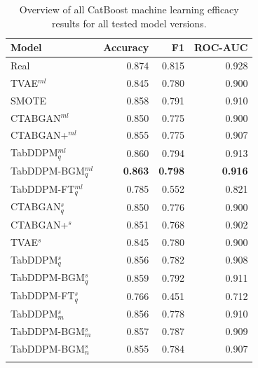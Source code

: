 \begin{table}[h]
	\centering
	\begin{tabular}{lrrr}
		\toprule
		\textbf{Model}        & \textbf{Accuracy} & \textbf{F1}    & \textbf{ROC-AUC} \\
		\midrule
		Real                  & 0.874              & 0.815          & 0.928            \\
		TVAE$^{ml}$           & 0.845              & 0.780          & 0.900            \\
		SMOTE                 & 0.858              & 0.791          & 0.910            \\
		CTABGAN$^{ml}$        & 0.850              & 0.775          & 0.900            \\
		CTABGAN+$^{ml}$       & 0.855              & 0.775          & 0.907            \\
		TabDDPM$^{ml}_q$      & 0.860              & 0.794          & 0.913            \\
		TabDDPM-BGM$^{ml}_q$  & \textbf{0.863}     & \textbf{0.798} & \textbf{0.916}   \\
		TabDDPM-FT$^{ml}_q$   & 0.785              & 0.552          & 0.821            \\
		CTABGAN$^{s}_q$       & 0.850              & 0.776          & 0.900            \\
		CTABGAN+$^{s}$        & 0.851              & 0.768          & 0.902            \\
		TVAE$^{s}$            & 0.845              & 0.780          & 0.900            \\
		TabDDPM$^{s}_q$       & 0.856              & 0.782          & 0.908            \\
		TabDDPM-BGM$^{s}_q$   & 0.859              & 0.792          & 0.911            \\
		TabDDPM-FT$^{s}_q$    & 0.766              & 0.451          & 0.712            \\
		TabDDPM$^{s}_m$       & 0.856              & 0.778          & 0.910            \\
		TabDDPM-BGM$^{s}_m$   & 0.857              & 0.787          & 0.909            \\
		TabDDPM-BGM$^{s}_{n}$ & 0.855              & 0.784          & 0.907            \\
		\bottomrule
		\multicolumn{4}{c}{}\\[-0.6em]
	\end{tabular}
	\caption[Overview all ML efficacy results]{Overview of all CatBoost machine learning efficacy results for all tested model versions.}
	\label{tab:ml-all}
\end{table}


